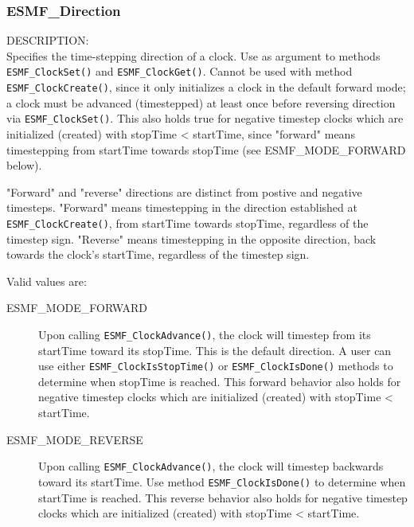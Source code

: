 
\subsubsection{ESMF\_Direction}

{\sf DESCRIPTION:\\}
Specifies the time-stepping direction of a clock.  Use as argument to
methods {\tt ESMF\_ClockSet()} and {\tt ESMF\_ClockGet()}.  Cannot be used
with method {\tt ESMF\_ClockCreate()}, since it only initializes a clock in
the default forward mode; a clock must be advanced (timestepped) at least once
before reversing direction via {\tt ESMF\_ClockSet()}.  This also holds true 
for negative timestep clocks which are initialized (created) with
stopTime < startTime, since "forward" means timestepping from startTime
towards stopTime (see ESMF\_MODE\_FORWARD below).

"Forward" and "reverse" directions are distinct from postive and negative
timesteps.  "Forward" means timestepping in the direction established at
{\tt ESMF\_ClockCreate()}, from startTime towards stopTime, regardless
of the timestep sign.  "Reverse" means timestepping in the opposite direction,
back towards the clock's startTime, regardless of the timestep sign.

Valid values are:
\begin{description}

\item [ESMF\_MODE\_FORWARD] 
      Upon calling {\tt ESMF\_ClockAdvance()}, the clock will timestep from
its startTime toward its stopTime.  This is the default direction.  A user
can use either {\tt ESMF\_ClockIsStopTime()} or {\tt ESMF\_ClockIsDone()}
methods to determine when stopTime is reached.  This forward behavior also
holds for negative timestep clocks which are initialized (created) with
stopTime < startTime.

\item [ESMF\_MODE\_REVERSE] 
      Upon calling {\tt ESMF\_ClockAdvance()}, the clock will timestep backwards
toward its startTime.  Use method {\tt ESMF\_ClockIsDone()} to determine when
startTime is reached.  This reverse behavior also holds for negative timestep
clocks which are initialized (created) with stopTime < startTime.

\end{description}

